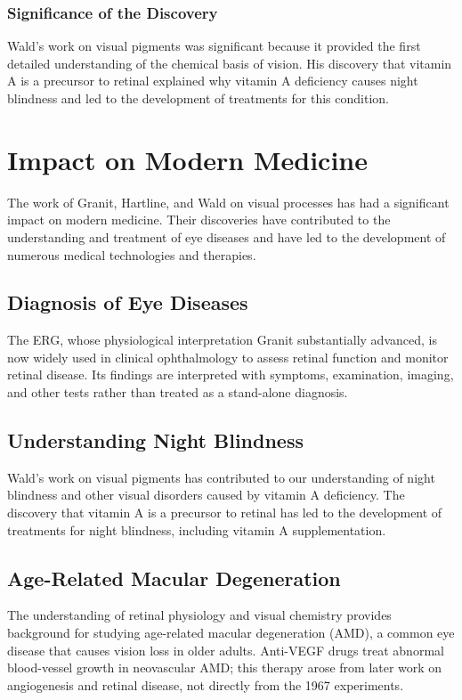 \subsubsection{Significance of the Discovery}

Wald's work on visual pigments was significant because it provided the first detailed understanding of the chemical basis of vision. His discovery that vitamin A is a precursor to retinal explained why vitamin A deficiency causes night blindness and led to the development of treatments for this condition.

\section{Impact on Modern Medicine}

The work of Granit, Hartline, and Wald on visual processes has had a significant impact on modern medicine. Their discoveries have contributed to the understanding and treatment of eye diseases and have led to the development of numerous medical technologies and therapies.

\subsection{Diagnosis of Eye Diseases}

The ERG, whose physiological interpretation Granit substantially advanced, is now widely used in clinical ophthalmology to assess retinal function and monitor retinal disease. Its findings are interpreted with symptoms, examination, imaging, and other tests rather than treated as a stand-alone diagnosis.

\subsection{Understanding Night Blindness}

Wald's work on visual pigments has contributed to our understanding of night blindness and other visual disorders caused by vitamin A deficiency. The discovery that vitamin A is a precursor to retinal has led to the development of treatments for night blindness, including vitamin A supplementation.

\subsection{Age-Related Macular Degeneration}

The understanding of retinal physiology and visual chemistry provides background for studying age-related macular degeneration (AMD), a common eye disease that causes vision loss in older adults. Anti-VEGF drugs treat abnormal blood-vessel growth in neovascular AMD; this therapy arose from later work on angiogenesis and retinal disease, not directly from the 1967 experiments.

